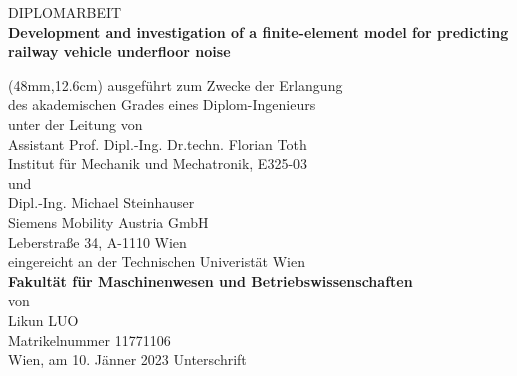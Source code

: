 \vspace{2.8cm}
\hspace{17mm}
\begin{minipage}{14cm} 
	{\LARGE DIPLOMARBEIT} \\[12mm]
	\doublespacing\textbf{\LARGE Development and investigation of a finite-element model for predicting railway vehicle underfloor noise}
\end{minipage}

	{\fontsize{12}{1} \selectfont
\begin{textblock*}{14cm}(48mm,12.6cm)
	\noindent
	ausgeführt zum Zwecke der Erlangung \\[2.5mm]
	des akademischen Grades eines Diplom-Ingenieurs \\[2.5mm]
	unter der Leitung von \\[8mm]
	Assistant Prof. Dipl.-Ing. Dr.techn. Florian Toth \\[2.5mm]
	Institut für Mechanik und Mechatronik, E325-03 \\[8mm]
    und \\[8mm]
    Dipl.-Ing. Michael Steinhauser \\[2.5mm]
    Siemens Mobility Austria GmbH \\[2.5mm]
    Leberstraße 34, A-1110 Wien \\[8mm]
	eingereicht an der Technischen Univeristät Wien \\[2.5mm]
	\textbf{Fakultät für Maschinenwesen und Betriebswissenschaften} \\[4mm]
	von \\[20mm]
	Likun LUO \\[2.5mm]
	Matrikelnummer 11771106 \\[2.5mm]
	Wien, am 10. Jänner 2023 \hspace{50mm} Unterschrift\\[25mm]
\end{textblock*}}